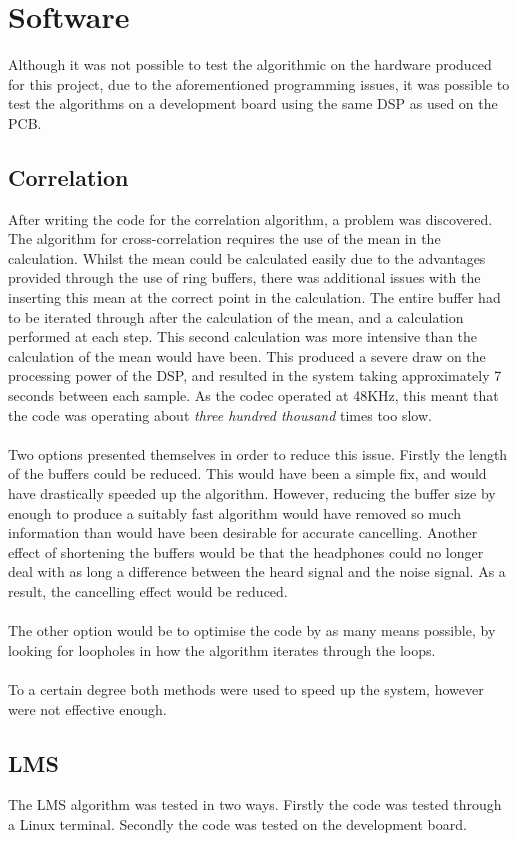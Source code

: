 \section{Software}

Although it was not possible to test the algorithmic on the hardware produced for this project, due to the aforementioned programming issues, it was possible to test the algorithms on a development board using the same DSP as used on the PCB.

\subsection{Correlation}
After writing the code for the correlation algorithm, a problem was discovered.
The algorithm for cross-correlation requires the use of the mean in the calculation.
Whilst the mean could be calculated easily due to the advantages provided through the use of ring buffers, there was additional issues with the inserting this mean at the correct point in the calculation.
The entire buffer had to be iterated through after the calculation of the mean, and a calculation performed at each step.
This second calculation was more intensive than the calculation of the mean would have been.
This produced a severe draw on the processing power of the DSP, and resulted in the system taking approximately 7 seconds between each sample.
As the codec operated at 48KHz, this meant that the code was operating about \emph{three hundred thousand} times too slow.
\\
\\
Two options presented themselves in order to reduce this issue.
Firstly the length of the buffers could be reduced.
This would have been a simple fix, and would have drastically speeded up the algorithm.
However, reducing the buffer size by enough to produce a suitably fast algorithm would have removed so much information than would have been desirable for accurate cancelling.
Another effect of shortening the buffers would be that the headphones could no longer deal with as long a difference between the heard signal and the noise signal.
As a result, the cancelling effect would be reduced.
\\
\\
The other option would be to optimise the code by as many means possible, by looking for loopholes in how the algorithm iterates through the loops.
\\
\\
To a certain degree both methods were used to speed up the system, however were not effective enough.

\subsection{LMS}

The LMS algorithm was tested in two ways.
Firstly the code was tested through a Linux terminal.
Secondly the code was tested on the development board.
